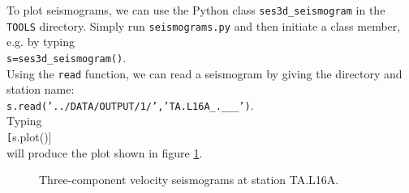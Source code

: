 To plot seismograms, we can use the Python class \texttt{ses3d\_seismogram} in the \texttt{TOOLS} directory. Simply run \texttt{seismograms.py} and then initiate a class member, e.g. by typing\\[5pt] 
\texttt{s=ses3d\_seismogram()}.\\[5pt] 
Using the \texttt{read} function, we can read a seismogram by giving the directory and station name:\\[5pt] \texttt{s.read('../DATA/OUTPUT/1/','TA.L16A\_.\_\_\_')}.\\[5pt]
Typing\\[5pt]
\texttt[s.plot()]\\[5pt]
will produce the plot shown in figure \ref{F:NA_seismo}. 
\begin{center}
\begin{figure}
\center{} 
\caption{Three-component velocity seismograms at station TA.L16A.}\label{F:NA_seismo}
\end{figure}
\end{center}
